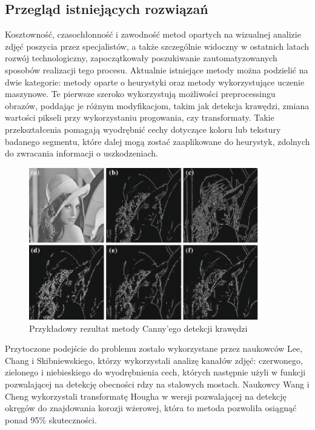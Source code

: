 \documentclass[polish,12pt]{aghthesis}
\begin{document}
\subsection{Przegląd istniejących rozwiązań}
\par
Kosztowność, czasochłonność i zawodność metod opartych na wizualnej analizie zdjęć poszycia przez specjalistów, a także szczególnie widoczny w ostatnich latach rozwój technologiczny, zapoczątkowały poszukiwanie zautomatyzowanych sposobów realizacji tego procesu. Aktualnie istniejące metody można podzielić na dwie kategorie: metody oparte o heurystyki oraz metody wykorzystujące uczenie maszynowe. Te pierwsze szeroko wykorzystują możliwości preprocessingu obrazów, poddając je różnym modyfikacjom, takim jak detekcja krawędzi, zmiana wartości pikseli przy wykorzystaniu progowania, czy transformaty. Takie przekształcenia pomagają wyodrębnić cechy dotyczące koloru lub tekstury badanego segmentu, które dalej mogą zostać zaaplikowane do heurystyk, zdolnych do zwracania informacji o uszkodzeniach. 
\begin{figure}[ht]
    \centering
    \includegraphics[width=10cm]{images/Lena.png}
    \caption{Przykładowy rezultat metody Canny'ego detekcji krawędzi\cite{artLena}}
    \label{fig:lena}
\end{figure}
\par
Przytoczone podejście do problemu zostało wykorzystane przez naukowców Lee, Chang i Skibniewskiego, którzy wykorzystali analizę kanałów zdjęć: czerwonego, zielonego i niebieskiego do wyodrębnienia cech, których następnie użyli w funkcji pozwalającej na detekcję obecności rdzy na stalowych mostach\cite{artSkib}. Naukowcy Wang i Cheng wykorzystali transformatę Hougha w wersji pozwalającej na detekcję okręgów do znajdowania korozji wżerowej, która to metoda pozwoliła osiągnąć ponad 95\% skuteczności\cite{artWang}. 
\end{document}
